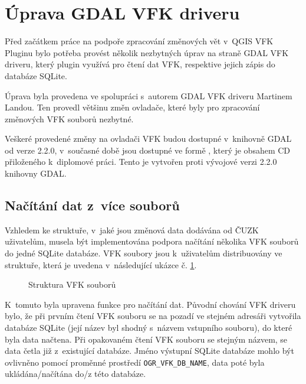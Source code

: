 \documentclass[a4paper,12pt,oneside]{book}
\begin{document}

\section{Úprava GDAL VFK driveru}
\label{l_uprava_gdal}
Před začátkem práce na podpoře zpracování změnových vět v~QGIS VFK
Pluginu bylo potřeba provést několik nezbytných úprav na straně GDAL
VFK driveru, který plugin využívá pro čtení dat VFK, respektive jejich
zápis do databáze SQLite.

Úprava byla provedena ve spolupráci s~autorem GDAL VFK driveru
Martinem Landou. Ten provedl většinu změn ovladače, které byly pro
zpracování změnových VFK souborů nezbytné.

Veškeré provedené změny na ovladači VFK budou dostupné v~knihovně GDAL
od verze 2.2.0, v~současné době jsou dostupné ve formě ,
který je obsahem CD přiloženého k~diplomové práci. Tento  je
vytvořen proti vývojové verzi 2.2.0 knihovny GDAL.

\subsection{Načítání dat z~více souborů}
Vzhledem ke struktuře, v~jaké jsou změnová data dodávána od ČUZK
uživatelům, musela být implementována podpora načítání několika VFK
souborů do jedné SQLite databáze. VFK soubory jsou k~uživatelům
distribuovány ve struktuře, která je uvedena v~následující ukázce
č. \ref{l_struktura_sireni_vfk}.

\begin{figure}[htb]
\centering
\begin{minipage}{0.9\textwidth}
\end{minipage}
\caption{Struktura VFK souborů}
\label{l_struktura_sireni_vfk}
\end{figure}

K~tomuto byla upravena funkce pro načítání dat. Původní chování VFK
driveru bylo, že při prvním čtení VFK souboru se na pozadí ve stejném
adresáři vytvořila databáze SQLite (její název byl shodný s~názvem
vstupního souboru), do které byla data načtena. Při opakovaném čtení
VFK souboru se stejným názvem, se data četla již z~existující
databáze. Jméno výstupní SQLite databáze mohlo být ovlivněno pomocí
proměnné prostředí \texttt{OGR\_VFK\_DB\_NAME}, data poté byla
ukládána/načítána do/z této databáze.
\end{document}
